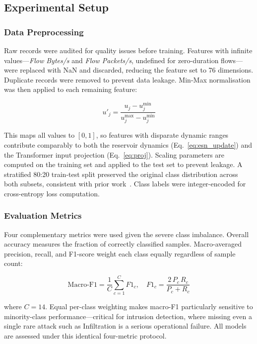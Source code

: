 \documentclass[5p,times]{elsarticle}
\begin{document}
	\subsection{Experimental Setup}
	
	\subsubsection{Data Preprocessing}
	\label{subsec:preprocessing}
	
	Raw records were audited for quality issues before training. Features
	with infinite values---\textit{Flow Bytes/s} and \textit{Flow
		Packets/s}, undefined for zero-duration flows---were replaced with NaN
	and discarded, reducing the feature set to 76 dimensions. Duplicate
	records were removed to prevent data leakage. Min-Max normalisation
	was then applied to each remaining feature:
	
	\begin{equation}
		u'_j = \frac{u_j - u_j^{\min}}{u_j^{\max} - u_j^{\min}}
		\label{eq:minmax}
	\end{equation}
	
	This maps all values to $[0,1]$, so features with disparate dynamic
	ranges contribute comparably to both the reservoir dynamics
	(Eq.~\eqref{eq:esn_update}) and the Transformer input projection
	(Eq.~\eqref{eq:proj}). Scaling parameters are computed on the training
	set and applied to the test set to prevent leakage. A stratified
	80:20 train-test split preserved the original class distribution
	across both subsets, consistent with prior
	work~\cite{cnnbigru2022,kurniabudi2020}. Class labels were
	integer-encoded for cross-entropy loss computation.
	
	\subsubsection{Evaluation Metrics}
	
	Four complementary metrics were used given the severe class imbalance.
	Overall accuracy measures the fraction of correctly classified
	samples. Macro-averaged precision, recall, and F1-score weight each
	class equally regardless of sample count:
	
	\begin{equation}
		\mathrm{Macro\text{-}F1} = \frac{1}{C}\sum_{c=1}^{C} F1_c,
		\quad
		F1_c = \frac{2\,P_c\,R_c}{P_c + R_c}
		\label{eq:macrof1}
	\end{equation}
	
	where $C = 14$. Equal per-class weighting makes macro-F1 particularly
	sensitive to minority-class performance---critical for intrusion
	detection, where missing even a single rare attack such as
	Infiltration is a serious operational failure. All models are
	assessed under this identical four-metric protocol.
	
\end{document}
